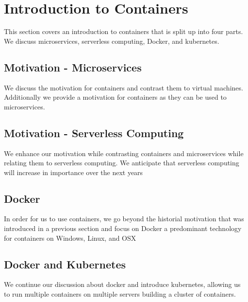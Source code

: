 
\chapter{Introduction to Containers}
\label{c:container}

\FILENAME

This section covers an introduction to containers that is split up
into four parts. We discuss microservices, serverless computing,
Docker, and kubernetes.

\section{Motivation - Microservices}
\label{s:motivation-microservices}

We discuss the motivation for containers and contrast them to virtual
machines. Additionally we provide a motivation for containers as they
can be used to microservices.


\section{Motivation - Serverless Computing}
\label{s:motivation-serverless}

We enhance our motivation while contrasting containers and
microservices while relating them to serverless computing. We
anticipate that serverless computing will increase in importance over
the next years


\section{Docker}
\label{s:motivation-docker}

In order for us to use containers, we go beyond the historial
motivation that was introduced in a previous section and focus on
Docker a predominant technology for containers on Windows, Linux, and
OSX


\section{Docker and Kubernetes}
\label{s:motivation-docker-kubernetes}

We continue our discussion about docker and introduce kubernetes,
allowing us to run multiple containers on multiple servers building a
cluster of containers.

